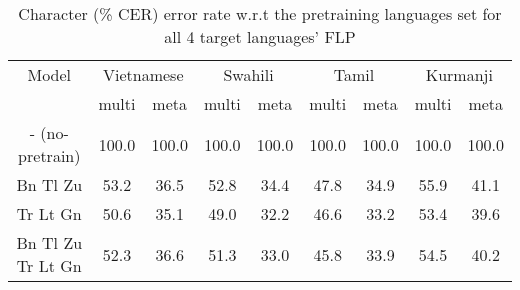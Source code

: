 \begin{table*}[ht!]
\centering
\caption{Character (\% CER)  error rate w.r.t the pretraining languages set for all 4 target languages' FLP}
\label{tab:block-results}
\begin{tabular}{@{}ccccccccc@{}}
\toprule
Model                                    & \multicolumn{2}{c}{Vietnamese}                         & \multicolumn{2}{c}{Swahili}                        & \multicolumn{2}{c}{Tamil}                        & \multicolumn{2}{c}{Kurmanji} \\

                                         & multi           & meta                                & multi           & meta                                & multi           & meta                                & multi           & meta           \\ \midrule
\multicolumn{1}{c|}{- (no-pretrain)}         & 100.0          & \multicolumn{1}{c|}{100.0}          & 100.0          & \multicolumn{1}{c|}{100.0}          & 100.0          & \multicolumn{1}{c|}{100.0}          & 100.0          & 100.0          \\

\multicolumn{1}{c|}{Bn Tl Zu}   & 53.2          & \multicolumn{1}{c|}{36.5}          & 52.8          & \multicolumn{1}{c|}{34.4}          & 47.8          & \multicolumn{1}{c|}{34.9}          & 55.9          & 41.1          \\
\multicolumn{1}{c|}{ Tr Lt Gn} & 50.6          & \multicolumn{1}{c|}{35.1}          & 49.0          & \multicolumn{1}{c|}{32.2}          & 46.6          & \multicolumn{1}{c|}{33.2}          & 53.4          & 39.6          \\
\multicolumn{1}{c|}{Bn Tl Zu Tr Lt Gn}           & 52.3          & \multicolumn{1}{c|}{36.6}          & 51.3          & \multicolumn{1}{c|}{33.0}          & 45.8          & \multicolumn{1}{c|}{33.9}          & 54.5          & 40.2          \\ \bottomrule
\end{tabular}
\end{table*}

